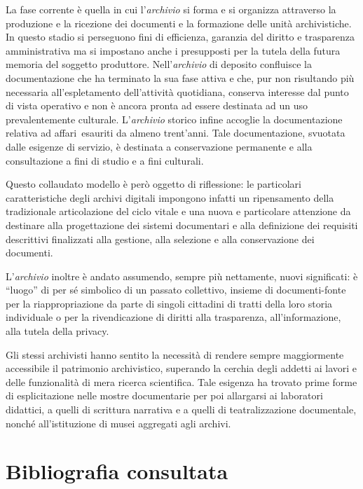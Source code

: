 \documentclass[
  b5paper,
  twoside,
  12pt,
  chapterprefix=false,
  bibliography=totocnumbered,
  parskip=false]{scrbook}
\begin{document}
La fase corrente è quella in cui l'\emph{archivio} si forma e si organizza
attraverso la produzione e la ricezione dei documenti e la formazione
delle unità archivistiche. In questo stadio si perseguono fini di
efficienza, garanzia del diritto e trasparenza amministrativa ma si
impostano anche i presupposti per la tutela della futura memoria del
soggetto produttore. Nell'\emph{archivio} di deposito confluisce la
documentazione che ha terminato la sua fase attiva e che, pur non
risultando più necessaria all'espletamento dell'attività quotidiana,
conserva interesse dal punto di vista operativo e non è ancora pronta ad
essere destinata ad un uso prevalentemente culturale. L'\emph{archivio}
storico infine accoglie la documentazione relativa ad affari~esauriti da
almeno trent'anni. Tale documentazione, svuotata dalle esigenze di
servizio, è destinata a conservazione permanente e alla consultazione a
fini di studio e a fini culturali.

Questo collaudato modello è però oggetto di riflessione: le particolari
caratteristiche degli archivi digitali impongono infatti un ripensamento
della tradizionale articolazione del ciclo vitale e una nuova e
particolare attenzione da destinare alla progettazione dei sistemi
documentari e alla definizione dei requisiti descrittivi finalizzati
alla gestione, alla selezione e alla conservazione dei documenti.

L'\emph{archivio} inoltre è andato assumendo, sempre più nettamente, nuovi
significati: è \enquote{luogo} di per sé simbolico di un passato collettivo,
insieme di documenti-fonte per la riappropriazione da parte di singoli
cittadini di tratti della loro storia individuale o per la
rivendicazione di diritti alla trasparenza, all'informazione, alla
tutela della privacy.

Gli stessi archivisti hanno sentito la necessità di rendere sempre
maggiormente accessibile il patrimonio archivistico, superando la
cerchia degli addetti ai lavori e delle funzionalità di mera ricerca
scientifica. Tale esigenza ha trovato prime forme di esplicitazione
nelle mostre documentarie per poi allargarsi ai laboratori didattici, a
quelli di scrittura narrativa e a quelli di teatralizzazione
documentale, nonché all'istituzione di musei aggregati agli archivi.

\hypertarget{bibliografia-consultata}{%
\section*{Bibliografia consultata}\label{bibliografia-consultata}}
\end{document}
